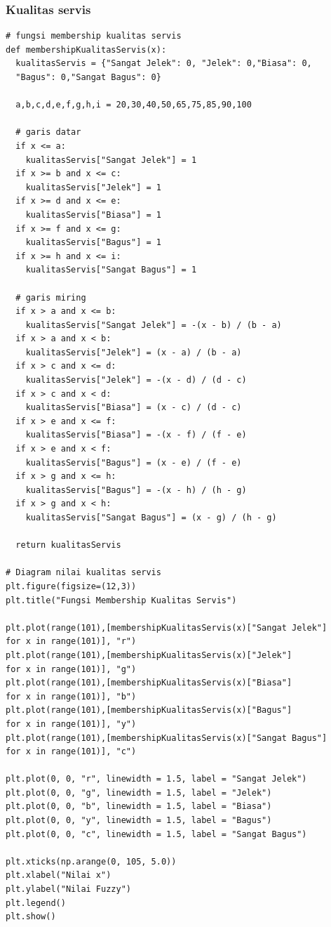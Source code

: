 \documentclass[12pt,a4paper]{article}
\theoremstyle{remark}
\begin{document}
\subsubsection*{Kualitas servis}
\begin{verbatim}
# fungsi membership kualitas servis
def membershipKualitasServis(x):
  kualitasServis = {"Sangat Jelek": 0, "Jelek": 0,"Biasa": 0,
  "Bagus": 0,"Sangat Bagus": 0}

  a,b,c,d,e,f,g,h,i = 20,30,40,50,65,75,85,90,100

  # garis datar
  if x <= a:
    kualitasServis["Sangat Jelek"] = 1
  if x >= b and x <= c:
    kualitasServis["Jelek"] = 1
  if x >= d and x <= e:
    kualitasServis["Biasa"] = 1
  if x >= f and x <= g:
    kualitasServis["Bagus"] = 1
  if x >= h and x <= i:
    kualitasServis["Sangat Bagus"] = 1

  # garis miring
  if x > a and x <= b:
    kualitasServis["Sangat Jelek"] = -(x - b) / (b - a)
  if x > a and x < b:
    kualitasServis["Jelek"] = (x - a) / (b - a)
  if x > c and x <= d:
    kualitasServis["Jelek"] = -(x - d) / (d - c)
  if x > c and x < d:
    kualitasServis["Biasa"] = (x - c) / (d - c)  
  if x > e and x <= f:
    kualitasServis["Biasa"] = -(x - f) / (f - e)
  if x > e and x < f:
    kualitasServis["Bagus"] = (x - e) / (f - e) 
  if x > g and x <= h:
    kualitasServis["Bagus"] = -(x - h) / (h - g)
  if x > g and x < h:
    kualitasServis["Sangat Bagus"] = (x - g) / (h - g) 
  
  return kualitasServis

# Diagram nilai kualitas servis
plt.figure(figsize=(12,3))
plt.title("Fungsi Membership Kualitas Servis")

plt.plot(range(101),[membershipKualitasServis(x)["Sangat Jelek"] 
for x in range(101)], "r")
plt.plot(range(101),[membershipKualitasServis(x)["Jelek"] 
for x in range(101)], "g")
plt.plot(range(101),[membershipKualitasServis(x)["Biasa"] 
for x in range(101)], "b")
plt.plot(range(101),[membershipKualitasServis(x)["Bagus"] 
for x in range(101)], "y")
plt.plot(range(101),[membershipKualitasServis(x)["Sangat Bagus"] 
for x in range(101)], "c")

plt.plot(0, 0, "r", linewidth = 1.5, label = "Sangat Jelek")
plt.plot(0, 0, "g", linewidth = 1.5, label = "Jelek")
plt.plot(0, 0, "b", linewidth = 1.5, label = "Biasa")
plt.plot(0, 0, "y", linewidth = 1.5, label = "Bagus")
plt.plot(0, 0, "c", linewidth = 1.5, label = "Sangat Bagus")

plt.xticks(np.arange(0, 105, 5.0))
plt.xlabel("Nilai x")
plt.ylabel("Nilai Fuzzy")
plt.legend()
plt.show()
\end{verbatim}
\end{document}
